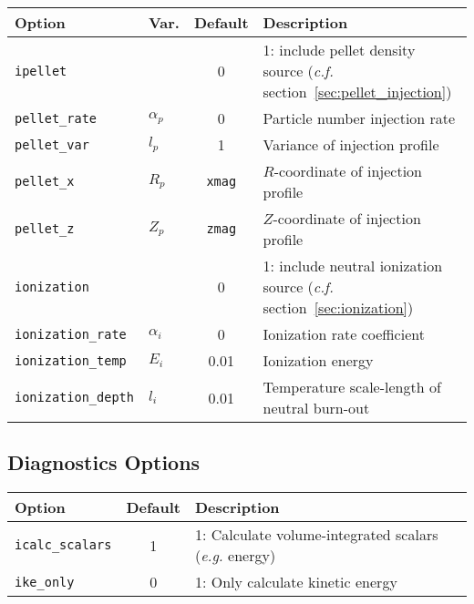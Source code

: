 \begin{tabular}{llcp{2in}}
  \textbf{Option}&\textbf{Var.}&\textbf{Default}&\textbf{Description}\\
  \hline
  \texttt{ipellet}      & & 0    & 1: include pellet density
    source (\textit{c.f.} section~\ref{sec:pellet_injection})\\
  \texttt{pellet\_rate} & $\alpha_p$ & 0 
                                     & Particle number injection rate\\
  \texttt{pellet\_var}  & $l_p$      & 1    & Variance of  
                                              injection profile\\
  \texttt{pellet\_x}    & $R_p$      & \texttt{xmag} 
                                     & $R$-coordinate of injection profile\\
  \texttt{pellet\_z}    & $Z_p$      & \texttt{zmag} 
                                     & $Z$-coordinate of injection profile\\
  \texttt{ionization}   & & 0  & 1: include neutral ionization
    source (\textit{c.f.} section~\ref{sec:ionization})\\
  \texttt{ionization\_rate} & $\alpha_i$ & 0 
                                     & Ionization rate coefficient\\
  \texttt{ionization\_temp} & $E_i$   & 0.01 & Ionization energy\\
  \texttt{ionization\_depth}& $l_i$   & 0.01 & Temperature 
    scale-length of neutral burn-out
\end{tabular}

\subsection{Diagnostics Options}

\begin{tabular}{lcp{3in}}
  \textbf{Option}&\textbf{Default}&\textbf{Description}\\
  \hline
  \texttt{icalc\_scalars} & 1 & 1: Calculate volume-integrated scalars 
                                (\textit{e.g.} energy)\\
  \texttt{ike\_only} & 0 & 1: Only calculate kinetic energy
\end{tabular}
